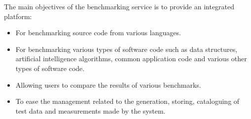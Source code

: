 The main objectives of the benchmarking service is to provide an integrated platform:
\begin{itemize}
	\item For benchmarking source code from various languages.
	\item For benchmarking various types of software code such as data structures,
        artificial intelligence algorithms, common application code and various 
        other types of software code.
	\item Allowing users to compare the results of various benchmarks.
	\item To ease the management related to the generation, storing, cataloguing 
        of test data and measurements made by the system.
\end{itemize}
